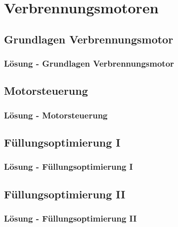 


\part{Verbrennungsmotoren}

\chapter{Grundlagen Verbrennungsmotor}
 \newpage
\section{Lösung - Grundlagen Verbrennungsmotor}

\chapter{Motorsteuerung}
 \newpage
\section{Lösung - Motorsteuerung}

\chapter{Füllungsoptimierung I}
 \newpage
\section{Lösung - Füllungsoptimierung I}

\chapter{Füllungsoptimierung II}
 \newpage
\section{Lösung - Füllungsoptimierung II}



